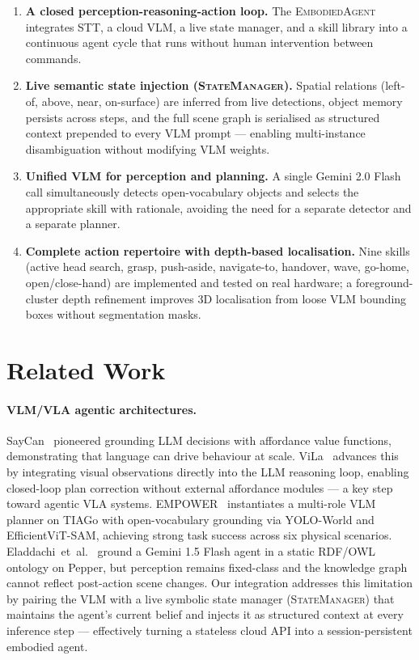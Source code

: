 \documentclass[twocolumn,10pt]{article}
\newcommand{\SM}{\textsc{StateManager}}
\begin{document}
\begin{enumerate}
  \item \textbf{A closed perception-reasoning-action loop.}
  The \textsc{EmbodiedAgent} integrates STT, a cloud VLM, a live state
  manager, and a skill library into a continuous agent cycle that runs
  without human intervention between commands.

  \item \textbf{Live semantic state injection (\SM).}
  Spatial relations (left-of, above, near, on-surface) are inferred from
  live detections, object memory persists across steps, and the full scene
  graph is serialised as structured context prepended to every VLM prompt
  — enabling multi-instance disambiguation without modifying VLM weights.

  \item \textbf{Unified VLM for perception and planning.}
  A single Gemini 2.0 Flash call simultaneously detects open-vocabulary
  objects and selects the appropriate skill with rationale, avoiding the
  need for a separate detector and a separate planner.

  \item \textbf{Complete action repertoire with depth-based localisation.}
  Nine skills (active head search, grasp, push-aside,
  navigate-to, handover, wave, go-home, open/close-hand) are implemented and tested on real hardware;
  a foreground-cluster depth refinement improves 3D localisation from
  loose VLM bounding boxes without segmentation masks.
\end{enumerate}

\section{Related Work}
\label{sec:related}

\paragraph{VLM/VLA agentic architectures.}
SayCan~\cite{ahn2022saycan} pioneered grounding LLM decisions with
affordance value functions, demonstrating that language can drive behaviour
at scale.
ViLa~\cite{hu2023vila} advances this by integrating visual observations
directly into the LLM reasoning loop, enabling closed-loop plan correction
without external affordance modules — a key step toward agentic VLA systems.
EMPOWER~\cite{argenziano2024empower} instantiates a multi-role VLM planner
on TIAGo with open-vocabulary grounding via YOLO-World and EfficientViT-SAM,
achieving strong task success across six physical scenarios.
Eladdachi~et~al.~\cite{eladdachi2025llm} ground a Gemini 1.5 Flash agent
in a static RDF/OWL ontology on Pepper, but perception remains fixed-class
and the knowledge graph cannot reflect post-action scene changes.
Our integration addresses this limitation by pairing the VLM with a live
symbolic state manager (\SM) that maintains the agent's current belief
and injects it as structured context at every inference step — effectively
turning a stateless cloud API into a session-persistent embodied agent.
\end{document}
